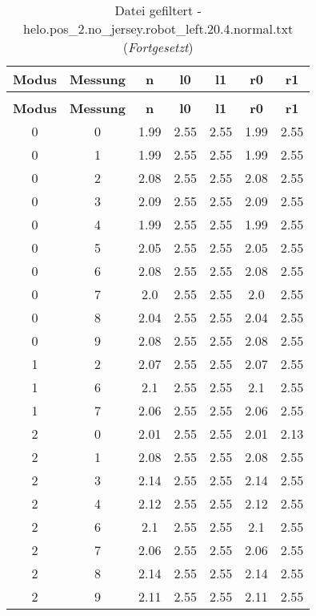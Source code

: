 \begin{longtable}{|c|c||c||c|c||c|c|}
	\caption{Datei gefiltert - helo.pos\_2.no\_jersey.robot\_left.20.4.normal.txt} \label{tab:helo.pos-2.no-jersey.robot-left.20.4.normal.txt} \\ \hline
	\textbf{Modus} & \textbf{Messung} & \textbf{n} & \textbf{l0} & \textbf{l1} & \textbf{r0} & \textbf{r1}\\ \hline
	\endfirsthead
	\caption[]{Datei gefiltert - helo.pos\_2.no\_jersey.robot\_left.20.4.normal.txt (\emph{Fortgesetzt})} \\ \hline
	\textbf{Modus} & \textbf{Messung} & \textbf{n} & \textbf{l0} & \textbf{l1} & \textbf{r0} & \textbf{r1}\\ \hline
	\endhead
	0 & 0 & 1.99 & 2.55 & 2.55 & 1.99 & 2.55 \\ \hline
	0 & 1 & 1.99 & 2.55 & 2.55 & 1.99 & 2.55 \\ \hline
	0 & 2 & 2.08 & 2.55 & 2.55 & 2.08 & 2.55 \\ \hline
	0 & 3 & 2.09 & 2.55 & 2.55 & 2.09 & 2.55 \\ \hline
	0 & 4 & 1.99 & 2.55 & 2.55 & 1.99 & 2.55 \\ \hline
	0 & 5 & 2.05 & 2.55 & 2.55 & 2.05 & 2.55 \\ \hline
	0 & 6 & 2.08 & 2.55 & 2.55 & 2.08 & 2.55 \\ \hline
	0 & 7 & 2.0 & 2.55 & 2.55 & 2.0 & 2.55 \\ \hline
	0 & 8 & 2.04 & 2.55 & 2.55 & 2.04 & 2.55 \\ \hline
	0 & 9 & 2.08 & 2.55 & 2.55 & 2.08 & 2.55 \\ \hline
	1 & 2 & 2.07 & 2.55 & 2.55 & 2.07 & 2.55 \\ \hline
	1 & 6 & 2.1 & 2.55 & 2.55 & 2.1 & 2.55 \\ \hline
	1 & 7 & 2.06 & 2.55 & 2.55 & 2.06 & 2.55 \\ \hline
	2 & 0 & 2.01 & 2.55 & 2.55 & 2.01 & 2.13 \\ \hline
	2 & 1 & 2.08 & 2.55 & 2.55 & 2.08 & 2.55 \\ \hline
	2 & 3 & 2.14 & 2.55 & 2.55 & 2.14 & 2.55 \\ \hline
	2 & 4 & 2.12 & 2.55 & 2.55 & 2.12 & 2.55 \\ \hline
	2 & 6 & 2.1 & 2.55 & 2.55 & 2.1 & 2.55 \\ \hline
	2 & 7 & 2.06 & 2.55 & 2.55 & 2.06 & 2.55 \\ \hline
	2 & 8 & 2.14 & 2.55 & 2.55 & 2.14 & 2.55 \\ \hline
	2 & 9 & 2.11 & 2.55 & 2.55 & 2.11 & 2.55 \\ \hline

\end{longtable}
